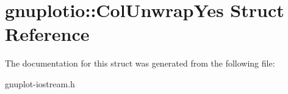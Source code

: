 \hypertarget{structgnuplotio_1_1ColUnwrapYes}{}\section{gnuplotio\+:\+:Col\+Unwrap\+Yes Struct Reference}
\label{structgnuplotio_1_1ColUnwrapYes}


The documentation for this struct was generated from the following file\+:\begin{DoxyCompactItemize}
\item 
gnuplot-\/iostream.\+h\end{DoxyCompactItemize}
